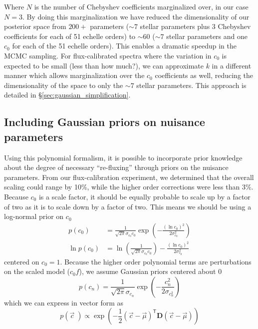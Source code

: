 \documentclass[preprint]{aastex} %
\newcommand{\vc}{\vec{c}}
\newcommand{\trans}{\mathsf{T}}
\begin{document}
Where $N$ is the number of Chebyshev coefficients marginalized over, in our case $N=3$. By doing this marginalization we have reduced the dimensionality of our posterior space from $200+$ parameters ($\sim 7$ stellar parameters plus 3 Chebyshev coefficients for each of 51 echelle orders) to $\sim 60$ ($\sim 7$ stellar parameters and one $c_0$ for each of the 51 echelle orders). This enables a dramatic speedup in the MCMC sampling. For flux-calibrated spectra where the variation in $c_0$ is expected to be small (less than how much?), we can approximate $k$ in a different manner which allows marginalization over the $c_0$ coefficients as well, reducing the dimensionality of the space to only the $\sim 7$ stellar parameters. This approach is detailed in \S\ref{sec:gaussian_simplification}.


\subsection{Including Gaussian priors on nuisance parameters}
\label{sec:priors}
Using this polynomial formalism, it is possible to incorporate prior knowledge about the degree of necessary ``re-fluxing'' through priors on the nuisance parameters. From our flux-calibration experiment, we determined that the overall scaling could range by 10\%, while the higher order corrections were less than 3\%. Because $c_0$ is a scale factor, it should be equally probable to scale up by a factor of two as it is to scale down by a factor of two. This means we should be using a log-normal prior on $c_0$
\begin{align}
  p(c_0) &= \frac{1}{\sqrt{2 \pi} \sigma_{c_0} c_0} \exp \left( -\frac{(\ln c_0)^2}{2 \sigma_{c_0}^2} \right) \\
  \ln p(c_0) &= \ln \left( \frac{1}{\sqrt{2 \pi} \sigma_{c_0} c_0} \right) - \frac{(\ln c_0)^2}{2 \sigma_{c_0}^2}
\end{align}
centered on $c_0 = 1$. Because the higher order polynomial terms are perturbations on the scaled model ($c_0 f$), we assume Gaussian priors centered about 0
\begin{equation}
  p(c_n) = \frac{1}{\sqrt{2 \pi} \sigma_{c_n}} \exp \left( - \frac{c_n^2}{2 \sigma_{c_n^2}} \right)
\end{equation}
which we can express in vector form as
\begin{equation}
  p(\vc\;) \propto \exp \left ( -\frac{1}{2} (\vc - \vec{\mu})^\trans {\bm D} (\vc - \vec{\mu}) \right )
  \label{eqn:nuisance_prior} 
\end{equation}
\end{document}
